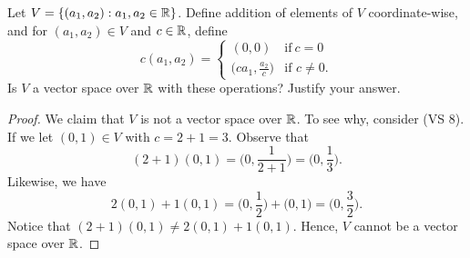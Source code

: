 Let \( V = \{ (a_{1}, a_{2}) : a_{1}, a_{2} \in \mathbb{R}  \}   \). Define addition of elements of \( V  \) coordinate-wise, and for \( (a_{1}, a_{2}) \in V  \) and \( c \in \mathbb{R}  \), define 
\[  c(a_{1}, a_{2} ) = 
\begin{cases}
    (0,0)  &\text{if} \ c = 0 \\
    \Big( ca_{1}, \frac{ a_{2}  }{ c  }  \Big) &\text{if } c \neq 0 .
\end{cases} \]
Is \( V  \) a vector space over \( \mathbb{R}  \) with these operations? Justify your answer.
\begin{proof}
We claim that \( V   \) is not a vector space over \( \mathbb{R}  \). To see why, consider (VS 8). If we let \( (0,1) \in V  \) with \( c = 2 + 1 = 3    \). Observe that 
\[  (2+1) (0,1) = \Big(0, \frac{ 1 }{ 2 + 1  }  \Big) = \Big( 0, \frac{ 1 }{ 3 }  \Big).   \]
Likewise, we have 
\[  2(0,1) + 1(0,1) = \Big( 0, \frac{ 1 }{ 2 }  \Big) + \Big( 0, 1 \Big) = \Big( 0, \frac{ 3 }{ 2 }  \Big).  \]
Notice that \( (2+1) (0,1) \neq 2(0,1) + 1(0,1)  \). Hence, \( V  \) cannot be a vector space over \( \mathbb{R}  \).  
\end{proof} 

